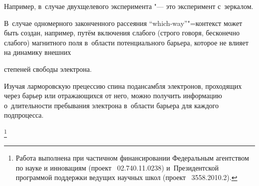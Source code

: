 Например, в~случае двухщелевого эксперимента "--- это эксперимент с~зеркалом. 

В~случае одномерного законченного рассеяния ``which-way''"=контекст может быть создан, например, путём включения слабого (строго говоря, бесконечно слабого) магнитного поля в~области потенциального барьера, которое не влияет на динамику внешних

степеней свободы электрона. 

Изучая ларморовскую прецессию спина подансамбля электронов, проходящих через барьер или отражающихся от него, можно получить информацию о~длительности пребывания электрона в~области барьера для каждого подпроцесса.



\thanks{Работа выполнена при частичном финансировании Федеральным агентством по науке и инновациям (проект \No~02.740.11.0238) и~Президентской программой поддержки ведущих научных школ (проект \No~3558.2010.2).}











